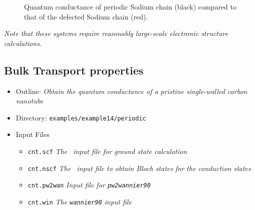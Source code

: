 \documentclass[a4paper,11pt,twoside]{article}
\begin{document}
\begin{figure}[h]
\begin{center}
\caption{Quantum conductance of periodic Sodium chain (black) compared to that of the defected Sodium chain (red).}
\label{fig:Na_qc}
\end{center}
\end{figure}



\emph{Note that these systems require reasonably large-scale electronic 
structure calculations.}

\subsection*{Bulk Transport properties}

\begin{itemize}
  \item{Outline: \it{Obtain the quantum conductance of a pristine single-walled carbon nanotube}}
  \item{Directory: {\tt examples/example14/periodic}}
  \item{Input Files}
    \begin{itemize}
      \item{ {\tt cnt.scf}  {\it The \pwscf\ input file for ground state
	  calculation}}
      \item{ {\tt cnt.nscf}  {\it The \pwscf\ input file to obtain Bloch
	  states for the conduction states}} 
      \item{ {\tt cnt.pw2wan}  {\it Input file for {\tt pw2wannier90}}}
      \item{ {\tt cnt.win}  {\it The {\tt wannier90} input file}}
    \end{itemize}
\end{itemize}
\end{document}

